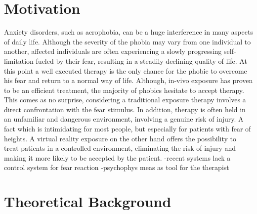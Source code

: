 


\section{Motivation}

Anxiety disorders, such as acrophobia, can be a huge interference in many aspects of daily life. Although the severity of the phobia may vary from one individual to another, affected individuals are often experiencing a slowly progressing self-limitation fueled by their fear, resulting in a steadily declining quality of life. At this point a well executed therapy is the only chance for the phobic to overcome his fear and return to a normal way of life. 
Although, in-vivo exposure has proven to be an efficient treatment, the majority of phobics hesitate to accept therapy. This comes as no surprise, considering a traditional exposure therapy involves a direct confrontation with the fear stimulus. In addition, therapy is often held in an unfamiliar and dangerous environment, involving a genuine risk of injury. A fact which is intimidating for most people, but especially for patients with fear of heights. A virtual reality exposure on the other hand offers the possibility to treat patients in a controlled environment, eliminating the risk of injury and making it more likely to be accepted by the patient. 
-recent systems lack a control system for fear reaction
-psychophys meas as tool for the therapist 








\section{Theoretical Background}

